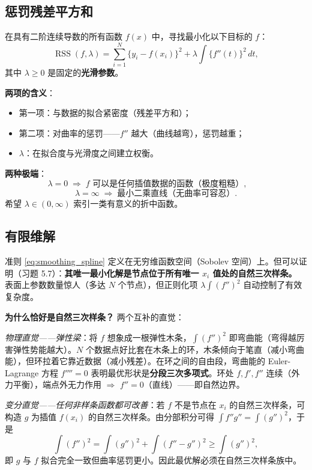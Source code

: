 \subsection{惩罚残差平方和}

在具有二阶连续导数的所有函数 $f(x)$ 中，寻找最小化以下目标的 $f$：
\begin{equation}\label{eq:smoothing_spline}
    \operatorname{RSS}(f, \lambda) = \sum_{i=1}^{N} \big\{ y_i - f(x_i) \big\}^2
    + \lambda \int \big\{ f''(t) \big\}^2 \, dt,
\end{equation}
其中 $\lambda \ge 0$ 是固定的\textbf{光滑参数}。

\textbf{两项的含义}：
\begin{itemize}
    \item 第一项：与数据的拟合紧密度（残差平方和）；
    \item 第二项：对曲率的惩罚——$f''$ 越大（曲线越弯），惩罚越重；
    \item $\lambda$：在拟合度与光滑度之间建立权衡。
\end{itemize}

\textbf{两种极端}：
\[
\lambda = 0 \;\Longrightarrow\; f \text{ 可以是任何插值数据的函数（极度粗糙）}, \qquad
\]
\[
\lambda = \infty \;\Longrightarrow\; \text{最小二乘直线（无曲率可容忍）}.
\]
希望 $\lambda \in (0, \infty)$ 索引一类有意义的折中函数。

\subsection{有限维解}

准则 \eqref{eq:smoothing_spline} 定义在无穷维函数空间（Sobolev 空间）上。但可以证明（习题 5.7）：\textbf{其唯一最小化解是节点位于所有唯一 $x_i$ 值处的自然三次样条。} 表面上参数数量惊人（多达 $N$ 个节点），但正则化项 $\lambda\int(f'')^2$ 自动控制了有效复杂度。

\textbf{为什么恰好是自然三次样条？} 两个互补的直觉：

\emph{物理直觉——弹性梁}：将 $f$ 想象成一根弹性木条，$\int(f'')^2$ 即弯曲能（弯得越厉害弹性势能越大）。$N$ 个数据点好比套在木条上的环，木条倾向于笔直（减小弯曲能），但环拉着它靠近数据（减小残差）。在环之间的自由段，弯曲能的 Euler-Lagrange 方程 $f''''=0$ 表明最优形状是\textbf{分段三次多项式}。环处 $f, f', f''$ 连续（外力平衡），端点外无力作用 $\Rightarrow$ $f''=0$（直线）——即自然边界。

\emph{变分直觉——任何非样条函数都可改善}：若 $f$ 不是节点在 $x_i$ 的自然三次样条，可构造 $g$ 为插值 $f(x_i)$ 的自然三次样条。由分部积分可得 $\int f''g'' = \int(g'')^2$，于是
\[
\int(f'')^2 = \int(g'')^2 + \int(f''-g'')^2 \ge \int(g'')^2,
\]
即 $g$ 与 $f$ 拟合完全一致但曲率惩罚更小。因此最优解必须在自然三次样条族中。

